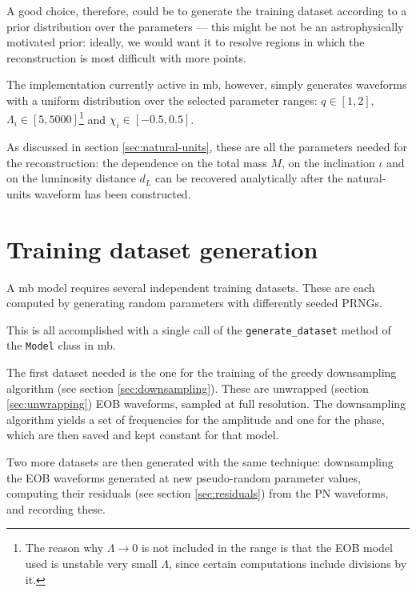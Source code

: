\documentclass[main.tex]{subfiles}
\begin{document}
A good choice, therefore, could be to generate the training dataset according to a prior distribution over the parameters --- this might be not be an astrophysically motivated prior: ideally, we would want it to resolve regions in which the reconstruction is most difficult with more points.

The implementation currently active in \ac{mb}, however, simply generates waveforms with a uniform distribution over the selected parameter ranges: \(q \in [1, 2]\), \(\Lambda _i \in [5, 5000]\)\footnote{The reason why \(\Lambda \to 0\) is not included in the range is that the \ac{EOB} model used is unstable very small \(\Lambda \), since certain computations include divisions by it.} and \(\chi_i \in [-0.5, 0.5]\).

As discussed in section \ref{sec:natural-units}, these are all the parameters needed for the reconstruction: the dependence on the total mass \(M\), on the inclination \(\iota \) and on the luminosity distance \(d_L\) can be recovered analytically after the natural-units waveform has been constructed.  


\section{Training dataset generation}

A \ac{mb} model requires several independent training datasets. These are each computed by generating random parameters with differently seeded \acp{PRNG}.

This is all accomplished with a single call of the \texttt{generate\_dataset} method of the \texttt{Model} class in \ac{mb}.

The first dataset needed is the one for the training of the greedy downsampling algorithm (see section \ref{sec:downsampling}). 
These are unwrapped (section \ref{sec:unwrapping}) \ac{EOB} waveforms, sampled at full resolution. 
The downsampling algorithm yields a set of frequencies for the amplitude and one for the phase, which are then saved and kept constant for that model.

Two more datasets are then generated with the same technique: 
downsampling the \ac{EOB} waveforms generated at new pseudo-random parameter values, computing their residuals (see section \ref{sec:residuals}) from the \ac{PN} waveforms, and recording these. 
\end{document}
